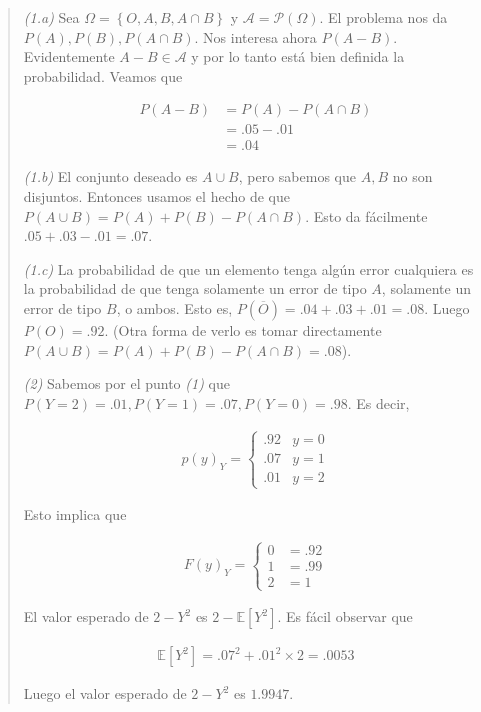\documentclass[a4paper, 12pt]{article}
\begin{document}
\small
\begin{quote}

\textit{(1.a)} Sea $\Omega = \left\{ O, A, B, A \cap B \right\} $ y $\mathcal{A}
= \mathcal{P}(\Omega)$. El problema nos da $P(A), P(B), P(A \cap B)$. Nos
interesa ahora $P(A - B)$. Evidentemente $A - B \in \mathcal{A}$ y por lo tanto
está bien definida la probabilidad. Veamos que

\begin{align*}
    P(A - B) &= P(A) - P(A \cap B) \\ 
             &= .05 - .01 \\ 
             &= .04
\end{align*}

\textit{(1.b)} El conjunto deseado es ${A} \cup {B}$, pero
sabemos que ${A}, {B}$ no son disjuntos. Entonces usamos el
hecho de que $P({A} \cup {B}) = P({A}) + P({B})
- P({A} \cap {B})$. Esto da fácilmente $.05 + .03 - .01 = .07$. 

\textit{(1.c)} La probabilidad de que un elemento tenga algún error cualquiera
es la probabilidad de que tenga solamente un error de tipo $A$, solamente un
error de tipo $B$, o ambos. Esto es, $P(\overline{O}) = .04 + .03 + .01 = .08$.
Luego $P(O) = .92$. (Otra forma de verlo es tomar directamente $P(A \cup B) =
P(A) + P(B) - P(A \cap B) = .08$).

\textit{(2)} Sabemos por el punto \textit{(1)} que $P(Y = 2) = .01, P(Y = 1) =
.07, P(Y = 0) = .98$. Es decir, 

\begin{align*}
    p(y)_Y = \begin{cases}
        .92 & y = 0 \\ 
        .07 & y = 1 \\ 
        .01 & y = 2
    \end{cases}
\end{align*}

Esto implica que 

\begin{align*}
    F(y)_Y = \begin{cases}
        0 &= .92 \\ 
        1  &= .99 \\ 
        2 &= 1
    \end{cases}
\end{align*}

El valor esperado de $2 - Y^2$ es $2 - \mathbb{E}[Y^2]$. Es fácil observar que

\begin{align*}
    \mathbb{E}\left[ Y^2 \right]  = .07^2 + .01^2 \times 2 = .0053
\end{align*}

Luego el valor esperado de $2 - Y^2$ es $1.9947$.

\end{quote}
\normalsize
\end{document}
